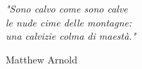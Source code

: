 \newlength\longest

\clearpage

\thispagestyle{empty}
\null\vfill

\settowidth{}
\begin{center}
    \parbox{\longest}{%
        \raggedright{\LARGE\itshape%
            "Sono calvo come sono calve\\
            le nude cime delle montagne:\\
            una calvizie colma di maestà."\par\bigskip
        }
        \raggedleft\Large{Matthew Arnold}\par%
    }
\end{center}


\vfill\vfill

\clearpage